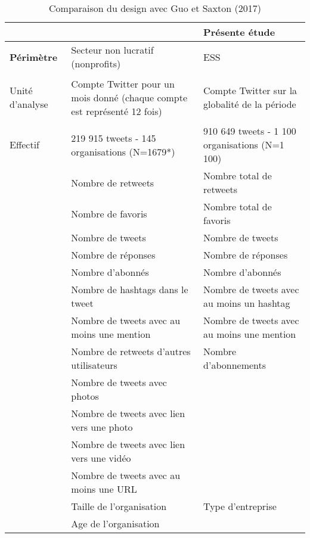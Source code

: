         \begin{table}
        \caption{Comparaison du design avec Guo et Saxton (2017)}
        \label{table:10comparaisonguo}
            \begin{tabularx}{\linewidth}{|>{\bfseries}p{3cm}|X|X|}
             \hline
             & \textbf{\textcite{guo2017speaking}} & \textbf{Présente étude} \\ \hline
             Périmètre	& Secteur non lucratif (nonprofits) &	ESS \\ \hline

            Unité \newline d’analyse	& Compte Twitter pour un mois donné (chaque compte est représenté 12 fois)	& Compte Twitter sur la globalité de la période \\ \hline

            Effectif&	219 915 tweets - 145 organisations (N=1679*)	& 910 649 tweets - 1 100 organisations (N=1 100) \\ \hline

            \multirow{2}{=}{Variables expliquées	}
                &Nombre de retweets & Nombre total de retweets  \\
                &Nombre de favoris & Nombre total de favoris \\ \hline

            \multirow{10}{=}{Variables explicatives}
                &Nombre de tweets & Nombre de tweets \\
                &Nombre de réponses & Nombre de réponses \\
                &Nombre d’abonnés & Nombre d’abonnés \\
                &Nombre de hashtags dans le tweet & Nombre de tweets avec au moins un hashtag \\
                &Nombre de tweets avec au moins une mention & Nombre de tweets avec au moins une mention \\
                &Nombre de retweets d’autres utilisateurs & Nombre d’abonnements  \\
                &Nombre de tweets avec photos &  \\
                &Nombre de tweets avec lien vers une photo &  \\
                &Nombre de tweets avec lien vers une vidéo & \\
                &Nombre de tweets avec au moins une URL & \\ \hline

            \multirow{2}{=}{Variables de contrôle	}
                &Taille de l’organisation & Type d’entreprise \\
                &Age de l’organisation&\\ \hline


\end{tabularx}
\end{table}
